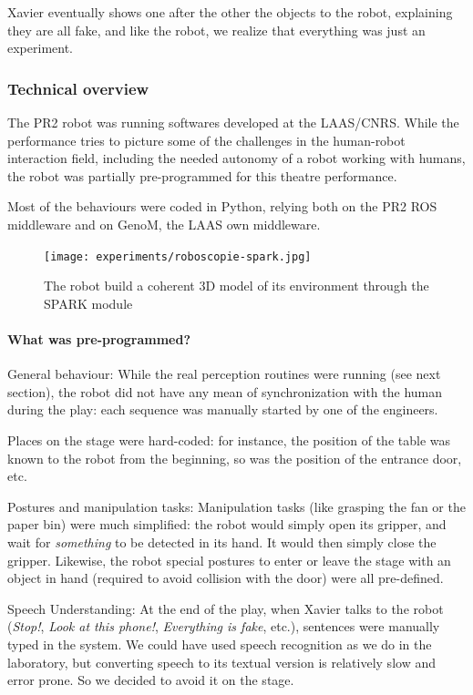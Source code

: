 Xavier eventually shows one after the other the objects to the robot,
explaining they are all fake, and like the robot, we realize that everything
was just an experiment.

\subsubsection{Technical overview}

The PR2 robot was running softwares developed at the LAAS/CNRS. While the
performance tries to picture some of the challenges in the human-robot
interaction field, including the needed autonomy of a robot working with
humans, the robot was partially pre-programmed for this theatre performance.

Most of the behaviours were coded in Python, relying both on the PR2 ROS
middleware and on {\sc GenoM}, the LAAS own middleware.

\begin{figure}
    \centering
    \texttt{[image: experiments/roboscopie-spark.jpg]}
    \caption{The robot build a coherent 3D model of its environment through the
    SPARK module}
    \label{fig|spark}
\end{figure}

\paragraph{What was pre-programmed?}

General behaviour: While the real perception routines were running
(see next section), the robot did not have any mean of synchronization with the
human during the play: each sequence was manually started by one of the
engineers.

Places on the stage were hard-coded: for instance, the position of the table
was known to the robot from the beginning, so was the position of the entrance
door, etc.

Postures and manipulation tasks: Manipulation tasks (like grasping
the fan or the paper bin) were much simplified: the robot would simply open its
gripper, and wait for \emph{something} to be detected in its hand. It would
then simply close the gripper. Likewise, the robot special postures to enter or
leave the stage with an object in hand (required to avoid collision with the
door) were all pre-defined.

Speech Understanding: At the end of the play, when Xavier talks to
the robot (\emph{Stop!}, \emph{Look at this phone!}, \emph{Everything is fake},
etc.), sentences were manually typed in the system. We could have used speech
recognition as we do in the laboratory, but converting speech to its textual
version is relatively slow and error prone. So we decided to avoid it on the
stage.


